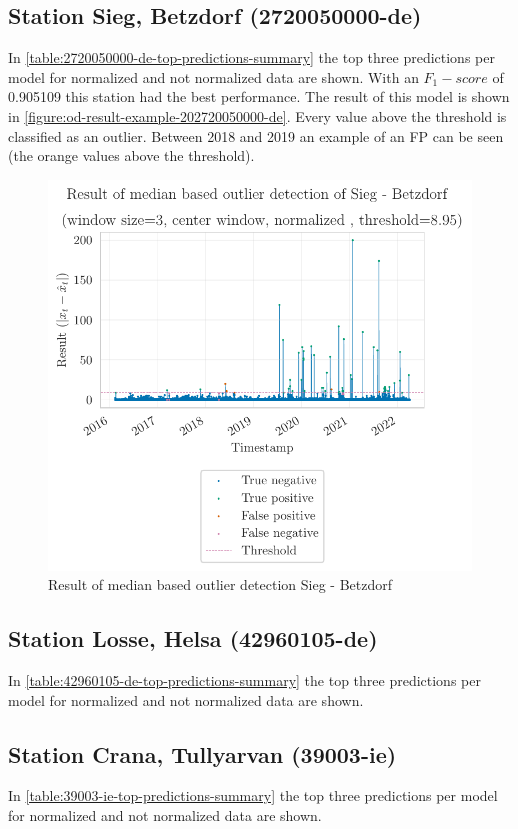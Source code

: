 \subsection{Station Sieg, Betzdorf (2720050000-de)}
In \autoref{table:2720050000-de-top-predictions-summary} the top three predictions per model for normalized and not normalized data are shown. With an $F_1-score$ of 0.905109 this station had the best performance. The result of this model is shown in \autoref{figure:od-result-example-202720050000-de}. Every value above the threshold is classified as an outlier. Between 2018 and 2019 an example of an \ac{FP} can be seen (the orange values above the threshold).

\begin{figure}[htp]
    \centering 
    \includegraphics{plots/pdfs/2720050000-de/od_result_median_2720050000-de_all.pdf}
    \caption{Result of median based outlier detection Sieg - Betzdorf}
    \label{figure:od-result-example-202720050000-de}
\end{figure}

\clearpage
\subsection{Station Losse, Helsa (42960105-de)}
In \autoref{table:42960105-de-top-predictions-summary} the top three predictions per model for normalized and not normalized data are shown.


\subsection{Station Crana, Tullyarvan (39003-ie)}
In \autoref{table:39003-ie-top-predictions-summary} the top three predictions per model for normalized and not normalized data are shown.


